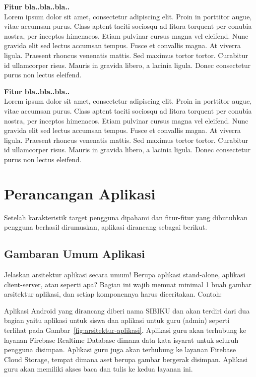 \documentclass[a4paper,11pt,oneside]{report}
\begin{document}
\textbf{Fitur bla..bla..bla..}\\
Lorem ipsum dolor sit amet, consectetur adipiscing elit. Proin in porttitor
augue, vitae accumsan purus. Class aptent taciti sociosqu ad litora torquent per
conubia nostra, per inceptos himenaeos. Etiam pulvinar cursus magna vel
eleifend. Nunc gravida elit sed lectus accumsan tempus. Fusce et convallis magna.
At viverra ligula. Praesent rhoncus venenatis mattis. Sed maximus tortor tortor.
Curabitur id ullamcorper risus. Mauris in gravida libero, a lacinia ligula.
Donec consectetur purus non lectus eleifend.

\textbf{Fitur bla..bla..bla..}\\
Lorem ipsum dolor sit amet, consectetur adipiscing elit. Proin in porttitor
augue, vitae accumsan purus. Class aptent taciti sociosqu ad litora torquent per
conubia nostra, per inceptos himenaeos. Etiam pulvinar cursus magna vel
eleifend. Nunc gravida elit sed lectus accumsan tempus. Fusce et convallis magna.
At viverra ligula. Praesent rhoncus venenatis mattis. Sed maximus tortor tortor.
Curabitur id ullamcorper risus. Mauris in gravida libero, a lacinia ligula.
Donec consectetur purus non lectus eleifend.

\section{Perancangan Aplikasi}
Setelah karakteristik target pengguna dipahami dan fitur-fitur yang dibutuhkan
pengguna berhasil dirumuskan, aplikasi dirancang sebagai berikut.

\subsection{Gambaran Umum Aplikasi}
Jelaskan arsitektur aplikasi secara umum! Berupa aplikasi stand-alone, aplikasi
client-server, atau seperti apa? Bagian ini wajib memuat minimal 1 buah gambar
arsitektur aplikasi, dan setiap komponennya harus diceritakan. Contoh:

Aplikasi Android yang dirancang diberi nama SIBIKU dan akan terdiri dari dua
bagian yaitu aplikasi untuk siswa dan aplikasi untuk guru (admin) seperti
terlihat pada Gambar~\ref{fig:arsitektur-aplikasi}. Aplikasi guru akan terhubung
ke layanan Firebase Realtime Database dimana data kata isyarat untuk seluruh
pengguna disimpan. Aplikasi guru juga akan terhubung ke layanan Firebase Cloud
Storage, tempat dimana aset berupa gambar bergerak disimpan. Aplikasi guru akan
memiliki akses baca dan tulis ke kedua layanan ini.
\end{document}

